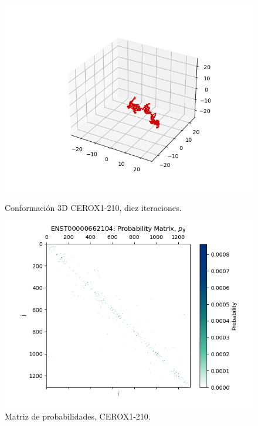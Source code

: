 \documentclass[a4paper,11pt,titlepage]{article}
\theoremstyle{definition}
\begin{document}
\begin{figure}[H]
    \centering
    \begin{minipage}[c]{0.45\textwidth}
        \centering
        \includegraphics[width=\textwidth]{images/CEROX1-210-db_iter.png}
        \caption{Conformación 3D CEROX1-210, diez iteraciones.}
        \label{fig:CEROX1-210-multi}
    \end{minipage}
    \hfill
    \begin{minipage}[c]{0.45\textwidth}
        \centering
        \includegraphics[width=\textwidth]{images/CEROX1-210-db_iter-matrix.png}
        \caption{Matriz de probabilidades, CEROX1-210.}
        \label{fig:CEROX1-210-matrix}
    \end{minipage}
\end{figure}
\end{document}
